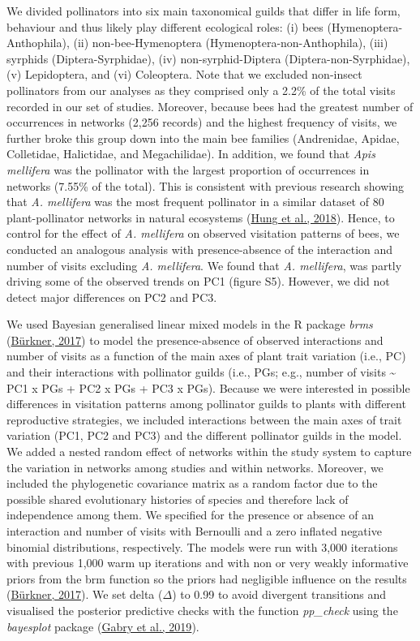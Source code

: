 \documentclass[
  12pt,
  a4paper,
]{article}
\begin{document}
We divided pollinators into six main taxonomical guilds that differ in life form, behaviour and thus likely play different ecological roles: (i) bees (Hymenoptera-Anthophila), (ii) non-bee-Hymenoptera (Hymenoptera-non-Anthophila), (iii) syrphids (Diptera-Syrphidae), (iv) non-syrphid-Diptera (Diptera-non-Syrphidae), (v) Lepidoptera, and (vi) Coleoptera. Note that we excluded non-insect pollinators from our analyses as they comprised only a 2.2\% of the total visits recorded in our set of studies. Moreover, because bees had the greatest number of occurrences in networks (2,256 records) and the highest frequency of visits, we further broke this group down into the main bee families (Andrenidae, Apidae, Colletidae, Halictidae, and Megachilidae). In addition, we found that \emph{Apis mellifera} was the pollinator with the largest proportion of occurrences in networks (7.55\% of the total). This is consistent with previous research showing that \emph{A. mellifera} was the most frequent pollinator in a similar dataset of 80 plant-pollinator networks in natural ecosystems (\protect\hyperlink{ref-hung2018}{Hung et al., 2018}). Hence, to control for the effect of \emph{A. mellifera} on observed visitation patterns of bees, we conducted an analogous analysis with presence-absence of the interaction and number of visits excluding \emph{A. mellifera}. We found that \emph{A. mellifera}, was partly driving some of the observed trends on PC1 (figure S5). However, we did not detect major differences on PC2 and PC3.

We used Bayesian generalised linear mixed models in the R package \emph{brms} (\protect\hyperlink{ref-burkner2017}{Bürkner, 2017}) to model the presence-absence of observed interactions and number of visits as a function of the main axes of plant trait variation (i.e., PC) and their interactions with pollinator guilds (i.e., PGs; e.g., number of visits \textasciitilde{} PC1 x PGs + PC2 x PGs + PC3 x PGs). Because we were interested in possible differences in visitation patterns among pollinator guilds to plants with different reproductive strategies, we included interactions between the main axes of trait variation (PC1, PC2 and PC3) and the different pollinator guilds in the model. We added a nested random effect of networks within the study system to capture the variation in networks among studies and within networks. Moreover, we included the phylogenetic covariance matrix as a random factor due to the possible shared evolutionary histories of species and therefore lack of independence among them. We specified for the presence or absence of an interaction and number of visits with Bernoulli and a zero inflated negative binomial distributions, respectively. The models were run with 3,000 iterations with previous 1,000 warm up iterations and with non or very weakly informative priors from the brm function so the priors had negligible influence on the results (\protect\hyperlink{ref-burkner2017}{Bürkner, 2017}). We set delta (\(\Delta\)) to 0.99 to avoid divergent transitions and visualised the posterior predictive checks with the function \emph{pp\_check} using the \emph{bayesplot} package (\protect\hyperlink{ref-gabry2019}{Gabry et al., 2019}).
\end{document}
